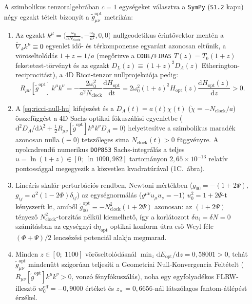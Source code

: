 \documentclass[11pt,a4paper]{article}
\begin{document}
A szimbolikus tenzoralgebrában $c = 1$ egységeket választva a \texttt{SymPy} (\texttt{S1.2} kapu) négy egzakt tételt bizonyít a $\tilde{g}_{\mu\nu}^{\mathrm{opt}}$ metrikán:
\begin{enumerate}
    \item Az egzakt $k^\mu = \bigl(\frac{\omega_0}{a N_{\mathrm{clock}}}, -\frac{\omega_0}{a^2}, 0, 0\bigr)$ nullgeodetikus érintővektor mentén a $\tilde{\nabla}_k k^\mu \equiv 0$ egyenlet idő- és térkomponense egyaránt azonosan eltűnik, a vöröseltolódás $1 + z \equiv 1/a$ (megőrizve a \texttt{COBE/FIRAS} $T(z) = T_0(1+z)$ feketetest-törvényt és az egzakt $D_L(z) \equiv (1+z)^2 D_A(z)$ Etherington-reciprocitást), a 4D Ricci-tenzor nullprojekciója pedig:
    \begin{equation}
        R_{\mu\nu}[\tilde{g}^{\mathrm{opt}}]\,k^\mu k^\nu = -\frac{2\omega_0^2}{a^2 N_{\mathrm{clock}}}\frac{\mathrm{d}H_{\mathrm{opt}}}{\mathrm{d}t} = 2\omega_0^2(1+z)^3 H_{\mathrm{opt}}(z)\frac{\mathrm{d}H_{\mathrm{opt}}(z)}{\mathrm{d}z} > 0.
        \label{eq:ricci-null-hu}
    \end{equation}
    \item A \eqref{eq:ricci-null-hu} kifejezést és a $D_A(t) = a(t)\chi(t)$ ($\dot{\chi} = -N_{\mathrm{clock}}/a$) összefüggést a 4D Sachs optikai fókuszálási egyenletbe ($\mathrm{d}^2 D_A/\mathrm{d}\lambda^2 + \frac{1}{2}R_{\mu\nu}[\tilde{g}^{\mathrm{opt}}]k^\mu k^\nu D_A = 0$) helyettesítve a szimbolikus maradék azonosan nulla ($\equiv 0$) tetszőleges sima $N_{\mathrm{clock}}(t) > 0$ függvényre. A nyolcadrendű numerikus \texttt{DOP853} Sachs-integrálás a teljes $u = \ln(1+z) \in [0;\; \ln 1090{,}982]$ tartományon $2{,}65\times 10^{-13}$ relatív pontossággal megegyezik a közvetlen kvadratúrával (1C.~ábra).
    \item Lineáris skalár-perturbációs rendben, Newtoni mértékben ($g_{00} = -(1 + 2\Psi)$, $g_{ij} = a^2(1 - 2\Phi)\delta_{ij}$) az egységnormálás ($g^{\mu\nu}u_\mu u_\nu = -1$) $u_0^2 = 1 + 2\Psi$-t kényszerít ki, amiből $\tilde{g}_{00}^{\mathrm{opt}} \equiv -N_{\mathrm{clock}}^2(1 + 2\Psi)$ azonosan: az $(1 + 2\Psi)$ tényező $N_{\mathrm{clock}}^2$-torzítás nélkül kiemelhető, így a korlátozott $\delta u_i = \delta N = 0$ számításban az egységnyi $\mathrm{d}\eta_{\mathrm{opt}}$ optikai konform útra eső Weyl-féle $(\Phi + \Psi)/2$ lencsézési potenciál alakja megmarad.
    \item Minden $z \in [0;\; 1100]$ vöröseltolódásnál $\min_z \mathrm{d}E_{\mathrm{opt}}/\mathrm{d}z = 0{,}58001 > 0$, tehát $\tilde{g}_{\mu\nu}^{\mathrm{opt}}$ mindenütt szigorúan teljesíti a Geometriai Null-Konvergencia Feltételt ($R_{\mu\nu}[\tilde{g}^{\mathrm{opt}}]k^\mu k^\nu > 0$, vonzó fényfókuszálás), noha egy egyfolyadékos FLRW-illesztő $w_0^{\mathrm{eff}} = -0{,}9000$ értéket és $z_\times = 0{,}6656$-nál látszólagos fantom-átlépést érzékel.
\end{enumerate}
\end{document}
